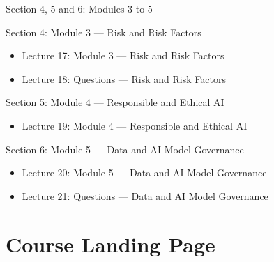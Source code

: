 \documentclass[aspectratio=169,11pt]{beamer}
\begin{document}
	\begin{frame}{Section 4, 5 and 6: Modules 3 to 5}
		\begin{block}{Section 4: Module 3 --- Risk and Risk Factors}
			\begin{itemize}
				\item Lecture 17: Module 3 --- Risk and Risk Factors
				\item Lecture 18: Questions --- Risk and Risk Factors
			\end{itemize}
		\end{block}
		\begin{block}{Section 5: Module 4 --- Responsible and Ethical AI}
			\begin{itemize}
				\item Lecture 19: Module 4 --- Responsible and Ethical AI
			\end{itemize}
		\end{block}
		\begin{block}{Section 6: Module 5 --- Data and AI Model Governance}
			\begin{itemize}
				\item Lecture 20: Module 5 --- Data and AI Model Governance
				\item Lecture 21: Questions --- Data and AI Model Governance
			\end{itemize}
		\end{block}
	\end{frame}
	
	\section{Course Landing Page}
	
\end{document}
